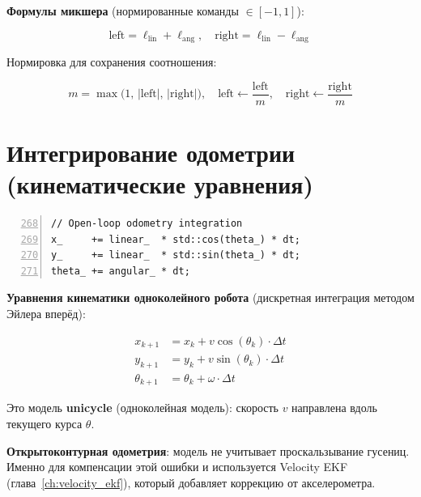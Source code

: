 \textbf{Формулы микшера} (нормированные команды $\in [-1, 1]$):

\begin{equation}
  \text{left} = \ell_{\text{lin}} + \ell_{\text{ang}}, \quad
  \text{right} = \ell_{\text{lin}} - \ell_{\text{ang}}
  \label{eq:diff_mixer}
\end{equation}

Нормировка для сохранения соотношения:

\begin{equation}
  m = \max\!\bigl(1,\, |\text{left}|,\, |\text{right}|\bigr), \quad
  \text{left} \leftarrow \frac{\text{left}}{m}, \quad
  \text{right} \leftarrow \frac{\text{right}}{m}
  \label{eq:normalize}
\end{equation}

\section{Интегрирование одометрии (кинематические уравнения)}

\begin{filebox}[title={\filepath{motor\_node.cpp}, строки 268--273}]
\begin{lstlisting}[style=cppstyle, numbers=left, firstnumber=268]
// Open-loop odometry integration
x_     += linear_  * std::cos(theta_) * dt;
y_     += linear_  * std::sin(theta_) * dt;
theta_ += angular_ * dt;
\end{lstlisting}
\end{filebox}

\textbf{Уравнения кинематики одноколейного робота}
(дискретная интеграция методом Эйлера вперёд):

\begin{align}
  x_{k+1} &= x_k + v \cos(\theta_k) \cdot \Delta t \label{eq:odom_x}\\
  y_{k+1} &= y_k + v \sin(\theta_k) \cdot \Delta t \label{eq:odom_y}\\
  \theta_{k+1} &= \theta_k + \omega \cdot \Delta t \label{eq:odom_theta}
\end{align}

Это модель \textbf{unicycle} (одноколейная модель): скорость $v$ направлена
вдоль текущего курса $\theta$.

\begin{notebox}
\textbf{Открытоконтурная одометрия}: модель не учитывает проскальзывание
гусениц. Именно для компенсации этой ошибки и используется Velocity EKF
(глава~\ref{ch:velocity_ekf}), который добавляет коррекцию от акселерометра.
\end{notebox}

